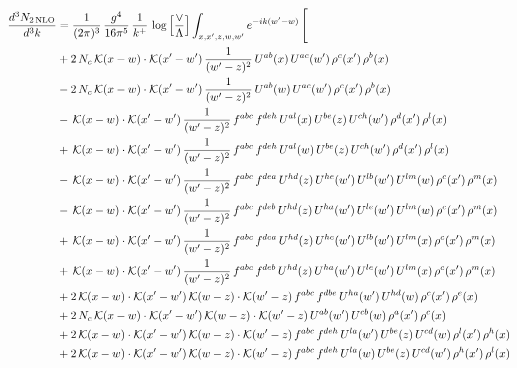 \documentclass[9pt]{article}
\numberwithin{equation}{section}
\begin{document}
\begin{align}
\frac{d^{3}N_{2\,\mathrm{NLO}}}{d^{3}k} & = \frac{1}{(2\pi)^{3}}\,\frac{g^{4}}{16\pi^{5}}\,\frac{1}{k^{+}}\,\log\Big[\frac{\vee}{\Lambda}\Big]\int_{x,x',z,w,w'}e^{-ik(w'-w)}\,\Bigg[
\notag \\ &+2\,N_{c}\,\mathcal{K}(x-w)\cdot\mathcal{K}(x'-w')\,\frac{1}{(w'-z)^{2}}\,U^{ab}(x)\,U^{ac}(w')\,\rho^{c}(x')\,\rho^{b}(x)\notag\\
&-2\,N_{c}\,\mathcal{K}(x-w)\cdot\mathcal{K}(x'-w')\,\frac{1}{(w'-z)^{2}}\,U^{ab}(w)\,U^{ac}(w')\,\rho^{c}(x')\,\rho^{b}(x)\notag\\
&-\,\mathcal{K}(x-w)\cdot\mathcal{K}(x'-w')\,\frac{1}{(w'-z)^{2}}\,f^{abc}\,f^{deh}\,U^{al}(x)\,U^{be}(z)\,U^{ch}(w')\,\rho^{d}(x')\,\rho^{l}(x)\notag\\
&+\,\mathcal{K}(x-w)\cdot\mathcal{K}(x'-w')\,\frac{1}{(w'-z)^{2}}\,f^{abc}\,f^{deh}\,U^{al}(w)\,U^{be}(z)\,U^{ch}(w')\,\rho^{d}(x')\,\rho^{l}(x)\notag \\ & -\,\mathcal{K}(x-w)\cdot\mathcal{K}(x'-w')\,\frac{1}{(w'-z)^{2}}\,f^{abc}\,f^{dea}\,U^{hd}(z)\,U^{he}(w')\,U^{lb}(w')\,U^{lm}(w)\,\rho^{c}(x')\,\rho^{m}(x)\notag\\
&-\,\mathcal{K}(x-w)\cdot\mathcal{K}(x'-w')\,\frac{1}{(w'-z)^{2}}\,f^{abc}\,f^{deb}\,U^{hd}(z)\,U^{ha}(w')\,U^{le}(w')\,U^{lm}(w)\,\rho^{c}(x')\,\rho^{m}(x)\notag\\
&+\,\mathcal{K}(x-w)\cdot\mathcal{K}(x'-w')\,\frac{1}{(w'-z)^{2}}\,f^{abc}\,f^{dea}\,U^{hd}(z)\,U^{he}(w')\,U^{lb}(w')\,U^{lm}(x)\,\rho^{c}(x')\,\rho^{m}(x)\notag\\
&+\,\mathcal{K}(x-w)\cdot\mathcal{K}(x'-w')\,\frac{1}{(w'-z)^{2}}\,f^{abc}\,f^{deb}\,U^{hd}(z)\,U^{ha}(w')\,U^{le}(w')\,U^{lm}(x)\,\rho^{c}(x')\,\rho^{m}(x)\notag\\
&+2\,\mathcal{K}(x-w)\cdot\mathcal{K}(x'-w')\,\mathcal{K}(w-z)\cdot\mathcal{K}(w'-z)\,f^{abc}\,f^{dbe}\,U^{ha}(w')\,U^{hd}(w)\,\rho^{c}(x')\,\rho^{e}(x)\notag\\
&+2\,N_{c}\,\mathcal{K}(x-w)\cdot\mathcal{K}(x'-w')\,\mathcal{K}(w-z)\cdot\mathcal{K}(w'-z)\,U^{ab}(w')\,U^{cb}(w)\,\rho^{a}(x')\,\rho^{c}(x)\notag \\ & +2\,\mathcal{K}(x-w)\cdot\mathcal{K}(x'-w')\,\mathcal{K}(w-z)\cdot\mathcal{K}(w'-z)\,f^{abc}\,f^{deh}\,U^{la}(w')\,U^{be}(z)\,U^{cd}(w)\,\rho^{l}(x')\,\rho^{h}(x)\notag\\
&+2\,\mathcal{K}(x-w)\cdot\mathcal{K}(x'-w')\,\mathcal{K}(w-z)\cdot\mathcal{K}(w'-z)\,f^{abc}\,f^{deh}\,U^{la}(w)\,U^{be}(z)\,U^{cd}(w')\,\rho^{h}(x')\,\rho^{l}(x)\notag\\

\end{align}
\end{document}
